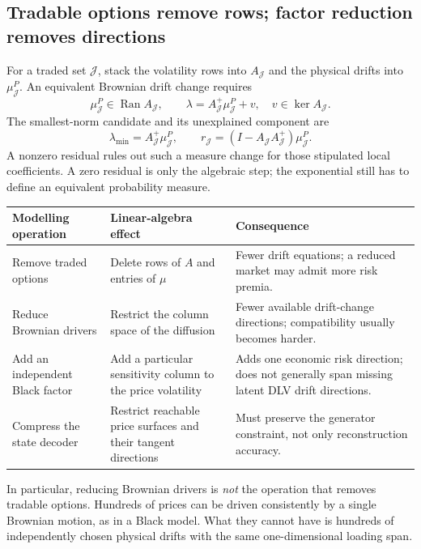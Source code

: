 \documentclass[11pt,a4paper]{article}
\numberwithin{equation}{section}
\theoremstyle{definition}\newtheorem{definition}[theorem]{Definition}
\theoremstyle{remark}\newtheorem{remark}[theorem]{Remark}
\newcommand{\Ran}{\operatorname{Ran}}\newcommand{\rank}{\operatorname{rank}}
\begin{document}
\subsection{Tradable options remove rows; factor reduction removes directions}
For a traded set $\mathcal J$, stack the volatility rows into $A_{\mathcal J}$ and the physical drifts into $\mu_{\mathcal J}^P$. An equivalent Brownian drift change requires
\begin{equation}
 \mu_{\mathcal J}^P\in\Ran A_{\mathcal J},\qquad
 \lambda=A_{\mathcal J}^{+}\mu_{\mathcal J}^P+v,\quad v\in\ker A_{\mathcal J}.
 \label{eq:lambda-family}
\end{equation}
The smallest-norm candidate and its unexplained component are
\begin{equation}
 \lambda_{\min}=A_{\mathcal J}^{+}\mu_{\mathcal J}^P,
 \qquad r_{\mathcal J}=(I-A_{\mathcal J}A_{\mathcal J}^{+})\mu_{\mathcal J}^P.
 \label{eq:span-residual}
\end{equation}
A nonzero residual rules out such a measure change for those stipulated local coefficients. A zero residual is only the algebraic step; the exponential still has to define an equivalent probability measure.

\begin{center}
\begin{tabularx}{\textwidth}{@{}>{\raggedright\arraybackslash}p{}>{\raggedright\arraybackslash}X>{\raggedright\arraybackslash}X@{}}
\toprule
Modelling operation & Linear-algebra effect & Consequence\\
\midrule
Remove traded options & Delete rows of $A$ and entries of $\mu$ & Fewer drift equations; a reduced market may admit more risk premia.\\
Reduce Brownian drivers & Restrict the column space of the diffusion & Fewer available drift-change directions; compatibility usually becomes harder.\\
Add an independent Black factor & Add a particular sensitivity column to the price volatility & Adds one economic risk direction; does not generally span missing latent DLV drift directions.\\
Compress the state decoder & Restrict reachable price surfaces and their tangent directions & Must preserve the generator constraint, not only reconstruction accuracy.\\
\bottomrule
\end{tabularx}
\end{center}
In particular, reducing Brownian drivers is \emph{not} the operation that removes tradable options. Hundreds of prices can be driven consistently by a single Brownian motion, as in a Black model. What they cannot have is hundreds of independently chosen physical drifts with the same one-dimensional loading span.
\end{document}
